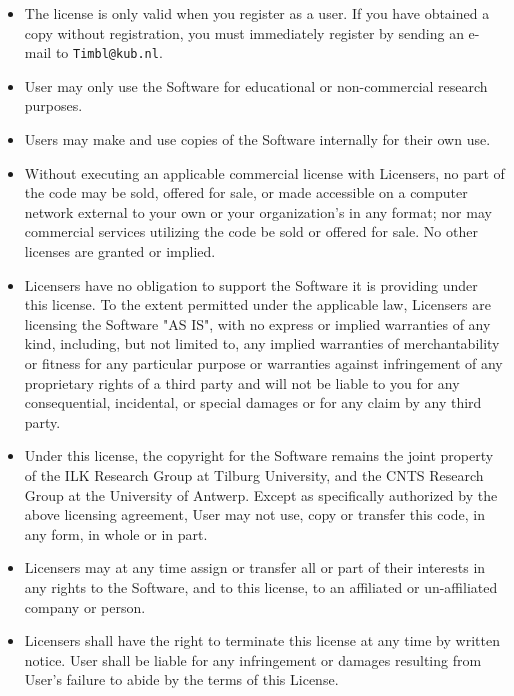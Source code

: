\documentclass{report}
\begin{document}
\begin{itemize}

\item The license is only valid when you register as a user. If you
have obtained a copy without registration, you must immediately
register by sending an e-mail to {\tt Timbl@kub.nl}.

\item User may only use the Software for educational or non-commercial
research purposes.

\item Users may make and use copies of the Software internally for
their own use.

\item Without executing an applicable commercial license with
Licensers, no part of the code may be sold, offered for sale, or made
accessible on a computer network external to your own or your
organization's in any format; nor may commercial services utilizing
the code be sold or offered for sale. No other licenses are granted or
implied.

\item Licensers have no obligation to support the Software it is
providing under this license.  To the extent permitted under the
applicable law, Licensers are licensing the Software "AS IS", with no
express or implied warranties of any kind, including, but not limited
to, any implied warranties of merchantability or fitness for any
particular purpose or warranties against infringement of any
proprietary rights of a third party and will not be liable to you for
any consequential, incidental, or special damages or for any claim by
any third party.

\item Under this license, the copyright for the Software remains the
joint property of the ILK Research Group at Tilburg University, and
the CNTS Research Group at the University of Antwerp.  Except as
specifically authorized by the above licensing agreement, User may not
use, copy or transfer this code, in any form, in whole or in part.

\item Licensers may at any time assign or transfer all or part of their
interests in any rights to the Software, and to this license, to an
affiliated or un-affiliated company or person.

\item Licensers shall have the right to terminate this license at any
time by written notice. User shall be liable for any infringement or
damages resulting from User's failure to abide by the terms of this
License.


\end{itemize}
\end{document}
